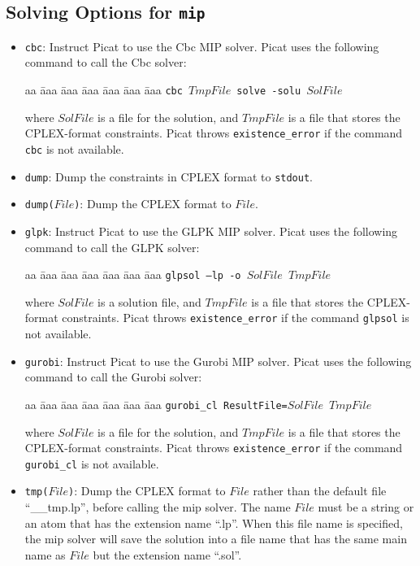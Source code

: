\subsection{Solving Options for \texttt{mip}}
\begin{itemize}
\item \texttt{cbc}: Instruct Picat to use the Cbc MIP solver. Picat uses the following command to call the Cbc solver:
\begin{tabbing}
aa \= aaa \= aaa \= aaa \= aaa \= aaa \= aaa \kill
\> \texttt{cbc $TmpFile$ solve -solu $SolFile$ }
\end{tabbing}
where $SolFile$ is a file for the solution, and $TmpFile$ is a file that stores the CPLEX-format constraints. Picat throws \texttt{existence\_error} if the command \texttt{cbc} is not available.
\item \texttt{dump}: Dump the constraints in CPLEX format to \texttt{stdout}.
\item \texttt{dump($File$)}: Dump the CPLEX format to $File$.
\item \texttt{glpk}: Instruct Picat to use the GLPK MIP solver. Picat uses the following command to call the GLPK solver:
\begin{tabbing}
aa \= aaa \= aaa \= aaa \= aaa \= aaa \= aaa \kill
\> \texttt{glpsol --lp -o $SolFile$ $TmpFile$}
\end{tabbing}
where $SolFile$ is a solution file, and $TmpFile$ is a file that stores the CPLEX-format constraints. Picat throws \texttt{existence\_error} if the command \texttt{glpsol} is not available.
\item \texttt{gurobi}: Instruct Picat to use the Gurobi MIP solver. Picat uses the following command to call the Gurobi solver:
\begin{tabbing}
aa \= aaa \= aaa \= aaa \= aaa \= aaa \= aaa \kill
\> \texttt{gurobi\_cl ResultFile=$SolFile$ $TmpFile$}
\end{tabbing}
where $SolFile$ is a file for the solution, and $TmpFile$ is a file that stores the CPLEX-format constraints. Picat throws \texttt{existence\_error} if the command \texttt{gurobi\_cl} is not available.
\item \texttt{tmp($File$)}: Dump the CPLEX format to $File$ rather than the default file ``\_\_tmp.lp'', before calling the mip solver. The name $File$  must be a string or an atom that has the extension name ``.lp''. When this file name is specified, the mip solver will save the solution into a file name that has the same main name as $File$ but the extension name ``.sol''.
\end{itemize}

